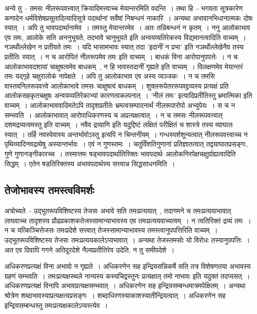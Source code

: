 		अन्ये तु~- तमसः नीलरूपवत्त्वात् क्रियादिमत्त्वाच्च मेयान्तरमिति वदन्ति~। तथा हि~- भगवता सूत्रकारेण कणादेन धर्मविशेषप्रसूतादित्यादिसूत्रे पदार्थानां सर्वेषां निबन्धनं नाकारि~। अन्यथा अभावानभिधानात्मकः दोषः स्यात्~। अपि तु भावपदार्थानामेव~। तमस्तु मेयान्तरमेव~। अतः तन्निबन्धनं न कृतम्~। ननु आलोकाभाव एव तमः, आलोके सति अननुभूयते, तदभावे चानुभूयते इति अन्वयव्यतिरेकस्य विद्यमानत्वादिति वाच्यम्~। नञर्थोल्लेखेन न प्रतीयते तमः~। यदि भासामभावः‌ स्यात् तदा 'इदानीं न प्रभा' इति नञर्थोल्लेखेनैव तस्य प्रतीतिः स्यात्~। न च आरोपितं नीलरूपमेव तमः इति वाच्यम्~। बाधकं विना आरोपानुपपत्तेः~। न च आलोकाभावदशायां चाक्षुषत्वमेव बाधकम्~, न हि भावस्तदानीं गृह्यते  इति वाच्यम्~। विलक्षणमेव मेयान्तरं तमः यद्गृहे चक्षुरालोकं नापेक्षते~। अपि तु आलोकाभाव एव अस्य व्यञ्जकः~। न च तमसि वास्तवनिलरूपवत्त्वे आलोकाभावे तमसः चाक्षुषत्वं बाधकम्~। शुक्लरूपेतररूपवद्द्रव्यस्य प्रत्यक्षं प्रति आलोकसहकृतचक्षुषः अन्वयव्यतिरेकाभ्यां कारणत्वकल्पनात्~। 'नीलं तमः' इत्यादिप्रतीतिस्तु भ्रमात्मिका इति वाच्यम्~। आलोकाभाववादिमतेऽपि तादृशप्रतीतेः भ्रमत्वसम्पादनार्थं नीलरूपारोपो अभ्युपेयः~। स च न सम्भवति~। आलोकाभावात् आरोपाधिकरणस्य च अप्रत्यक्षत्वात्~। न च तमसः नीलरूपवत्त्वात् दशमद्रव्यत्वमस्तु इति वाच्यम्~। नवैव द्रव्याणि इति यदुद्दिष्टं लक्षितं परीक्षितं च शास्त्रे तस्य व्याघातः स्यात्~। तर्हि नवस्वेवास्य अन्तर्भावोऽस्तु इत्यपि न चिन्तनीयम्~। गन्धस्पर्शशून्यत्वात् नीलरूपवत्त्वाच्च न पृथिव्यादिनवद्रव्येषु अस्यान्तर्भावः~। एवं न गुणस्तमः~। चतुर्विंशतिगुणानां प्रतिज्ञातत्वात् तद्व्याघातप्रसङ्गः, गुणे गुणानङ्गीकारच्च~। तस्मात्तमः षड्भावपदार्थातिरिक्तः भावपदार्थः आलोकनिरपेक्षचक्षुर्ग्राह्यत्वादिति सिद्धम्~। एतेन षडतिरिक्तस्य अभावपदार्थस्य सत्त्वान्न सिद्धसाधनमिति~।

		\subsection{तेजोभावस्य तमस्त्वविमर्शः}

		अत्रोच्यते~- उद्भूतरूपविशिष्टस्य तेजसः अभावे सति तमःप्रत्ययात्~, तदागमने च तमःप्रत्ययाभावात् लाघवाच्च तादृशस्य प्रौढप्रकाशकतेजस्सामान्याभावस्य एव तमःप्रत्ययवाच्यत्वम्~। न त्वतिरिक्तं द्रव्यं तमः~। न च यत्किञ्चित्तेजसः तमःप्रदेशे सत्त्वात् तेजस्सामान्याभावस्य तमस्त्वानुपपत्तिरिति वाच्यम्~। उद्भूतरूपविशिष्टस्य तेजसः तमःप्रत्ययकालेऽप्यभावात्~। अन्यथा तेजस्तमसोः यो विरोधः तस्यानुपपत्तिः~। अत एव दिवापि गगने अतिदूरदेशे नैल्यप्रतीतिरेव उदेति, न तु समीपदेशे~। 
		 
		अधिकरणप्रत्यक्षं विना अभावो न गृह्यते~। अधिकरणेन सह इन्द्रियसन्निकर्षे सति तत्र विशेषणतया अभावस्य ग्रहणं सम्भवति~। तमःप्रत्यक्षस्थले नान्यस्य कस्यचिद्वस्तुनः प्रत्यक्षात् तमो नाभावः इति यदुक्तं तदप्यसत्~। अधिकरणप्रत्यक्षं विनापि अभावप्रत्यक्षसम्भवात्~। अधिकरणेन सह इन्द्रियसम्बन्धमात्रमपेक्षितम्~। अन्यथा श्रोत्रेण शब्दाभावस्याप्रत्यक्षत्वप्रसङ्गः~। शब्दाधिरणस्याकाशस्यातीन्द्रियत्वात्~। अधिकरणेन सह इन्द्रियसम्बन्धस्तु तमःप्रत्यक्षकालेऽप्यस्त्येव~।

